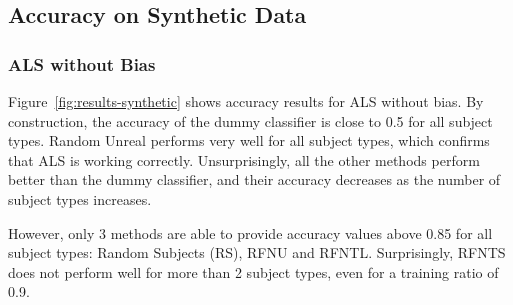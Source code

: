 \documentclass[10pt, conference, compsocconf]{IEEEtran}
\newcommand{\todo}[1]{\marginpar{\parbox{18mm}{\flushleft\tiny\color{red}\textbf{TODO}:
      #1}}}
\begin{document}

\subsection{Accuracy on Synthetic Data}

\subsubsection{ALS without Bias}
 Figure~\ref{fig:results-synthetic} shows accuracy results for ALS 
 without bias. By construction, the accuracy of the dummy classifier is 
 close to 0.5 for all subject types. Random Unreal performs very well 
 for all subject types, which confirms that ALS is working correctly. 
 Unsurprisingly, all the other methods 
perform better than the dummy classifier, and their accuracy decreases 
as the number of subject types increases.

However, only 3 methods are able to provide accuracy values above 0.85 
for all subject types: Random Subjects (RS), RFNU and RFNTL. 
Surprisingly, RFNTS does not perform well for more than 2 subject 
types, even for a training ratio of 0.9.
\end{document}
